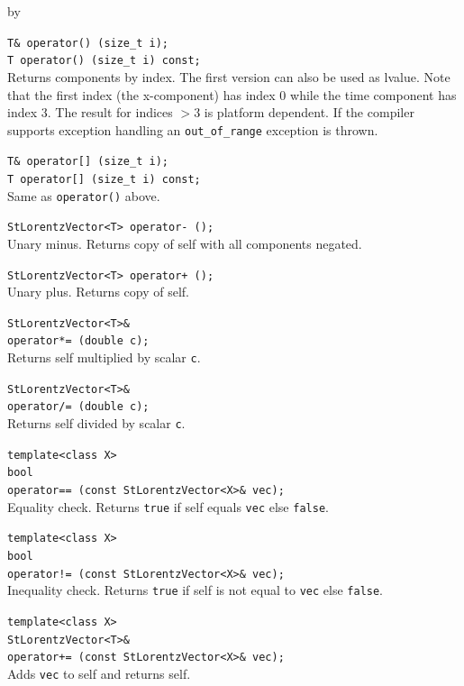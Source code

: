 \documentclass[twoside]{article}
\newcommand{\comp}[1]{\texttt{#1}}%
\newcommand{\entrylabel}[1]{\mbox{\textbf{{#1}}}\hfil}%
\newenvironment{entry}
{\begin{list}{}%
    {\renewcommand{\makelabel}{\entrylabel}%
     \setlength{\labelwidth}{90pt}%
     \setlength{\leftmargin}{\labelwidth}
     \advance\leftmargin by \labelsep%
      }%
    }%
  {\end{list}}
\newcommand{\Entrylabel}[1]%
{\raisebox{0pt}[1ex][0pt]{\makebox[\labelwidth][l]%
    {\parbox[t]{\labelwidth}{\hspace{0pt}\textbf{{#1}}}}}}
\newenvironment{Entry}%
{\renewcommand{\entrylabel}{\Entrylabel}\begin{entry}}%
  {\end{entry}}
\begin{document}
\begin{Entry}
    \verb+T& operator() (size_t i);+\\
    \verb+T operator() (size_t i) const;+\\
    Returns components by index. The first version can also be used as
    lvalue. Note that the first index (the x-component) has index 0
    while the time component has index 3.  The result for indices $>
    3$ is platform dependent. If the compiler supports exception
    handling an \comp{out\_of\_range} exception is thrown.
    
    \verb+T& operator[] (size_t i);+\\
    \verb+T operator[] (size_t i) const;+\\
    Same as \comp{operator()} above.

    \verb+StLorentzVector<T> operator- ();+\\
    Unary minus. Returns copy of self with all components negated.
    
    \verb#StLorentzVector<T> operator+ ();#\\
    Unary plus. Returns copy of self.
    
    \verb+StLorentzVector<T>&+\\
    \verb+operator*= (double c);+\\
    Returns self multiplied by scalar \comp{c}.
    
    \verb+StLorentzVector<T>&+\\
    \verb+operator/= (double c);+\\
    Returns self divided by scalar \comp{c}.
    
    \verb+template<class X>+\\
    \verb+bool+\\
    \verb+operator== (const StLorentzVector<X>& vec);+\\
    Equality check. Returns \comp{true} if self equals
    \comp{vec} else \comp{false}.
    
    \verb+template<class X>+\\
    \verb+bool+\\
    \verb+operator!= (const StLorentzVector<X>& vec);+\\
    Inequality check. Returns \comp{true} if self is not equal to
    \comp{vec} else \comp{false}.
    
    \verb+template<class X>+\\
    \verb+StLorentzVector<T>&+\\
    \verb#operator+= (const StLorentzVector<X>& vec);#\\
    Adds \comp{vec} to self and returns self.
    

\end{Entry}
\end{document}
